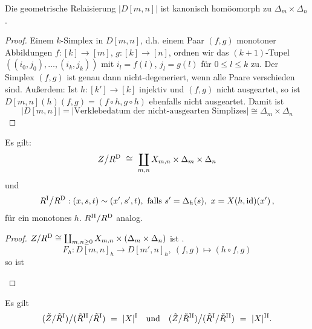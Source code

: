 \begin{lemma}
  \label{lemma:11}
  Die geometrische Relaisierung $|D[m,n]|$ ist kanonisch homöomorph zu
  $\Delta_m\times \Delta_n$.
\end{lemma}
\begin{proof}
  Einem $k$-Simplex in $D[m,n]$, d.h. einem Paar $(f,g)$ monotoner
  Abbildungen $f:[k]\to[m]$, $g:[k]\to [n]$, ordnen wir das $(k+1)$-Tupel
  $((i_0,j_0),\ldots,(i_k,j_k))$ mit $i_l = f(l)$, $j_l=g(l)$ für 
  $0\leq l\leq k$ zu. Der Simplex $(f,g)$ ist genau dann nicht-degeneriert,
  wenn alle Paare verschieden sind. Außerdem: Ist $h:[k']\to[k]$ injektiv und
  $(f,g)$ nicht ausgeartet, so ist $D[m,n](h)(f,g) = (f\circ h, g\circ h)$
  ebenfalls nicht ausgeartet. Damit ist
  \[|D[m,n]| = |\text{Verklebedatum der nicht-ausgearten Simplizes}|
    \cong \Delta_m\times\Delta_n\]
\end{proof}


\begin{folgerung}
  Es gilt: 
  \[ Z\big/ R^\mathrm{D} \ \cong\  \coprod_{m,n} X_{m,n}\times \Delta_m 
    \times \Delta_n\]
  und
  \[ R^\mathrm{I} \big/R^\mathrm{D}: (x,s,t) \sim(x',s',t),
    \text{ falls } s'=\Delta_h(s),\ x = X(h,\operatorname{id})(x')\,,\]
  für ein monotones $h$. $R^\mathrm{II}/R^\mathrm{D}$ analog.
\end{folgerung}
\begin{proof}
  $Z/R^\mathrm{D} \cong\coprod_{m,n\geq 0} X_{m,n} \times (\Delta_m\times \Delta_n)$
  ist .
  \[ F_h: D[m,n]_h \to D[m',n]_h,\ (f,g) \mapsto (h\circ f, g)\]
  so ist 
  \begin{center}
  \end{center}
\end{proof}



\begin{folgerung}
  Es gilt
  \[ (\tilde Z / \tilde R^\mathrm{I})\big/ (\tilde R^\mathrm{II}/\tilde R^\mathrm{I}) 
    \ =\  |X|^\mathrm{I} \quad\text{und}\quad
    (\tilde Z/\tilde R^\mathrm{II}) \big/ (\tilde R^\mathrm{I} / \tilde R^\mathrm{II}) 
    \ =\  |X|^\mathrm{II}.\]
\end{folgerung}



